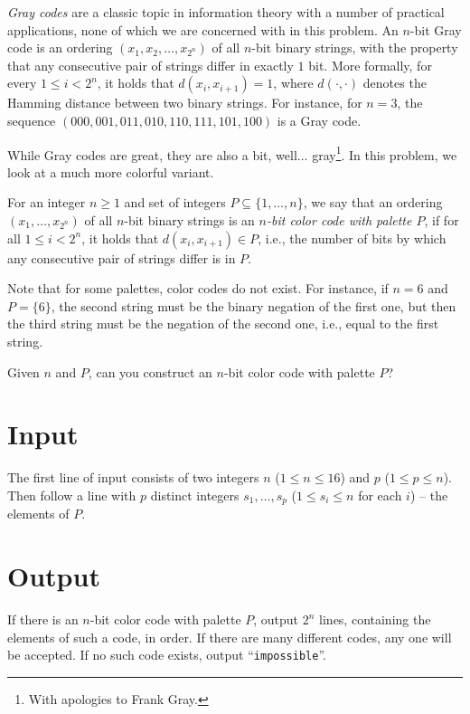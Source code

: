 
%
\noindent
\emph{Gray codes} are a classic topic in information theory with a
number of practical applications, none of which we are concerned with
in this problem.  An $n$-bit Gray code is an ordering $(x_1,
x_2, \ldots, x_{2^n})$ of all $n$-bit binary strings, with the
property that any consecutive pair of strings differ in exactly $1$
bit.  More formally, for every $1 \le i < 2^n$, it holds that
$d(x_{i}, x_{i+1}) = 1$, where $d(\cdot, \cdot)$ denotes the Hamming
distance between two binary strings.  For instance, for $n=3$, the
sequence $(000, 001, 011, 010, 110, 111, 101, 100)$ is a Gray code.

While Gray codes are great, they are also a bit, well... gray\footnote{With
apologies to Frank Gray.}.  In this problem, we look at a much more
colorful variant.

For an integer $n \ge 1$ and set of integers $P \subseteq \{1,
\ldots, n\}$, we say that an ordering $(x_1, \ldots, x_{2^n})$ of all
$n$-bit binary strings is an \emph{$n$-bit color code with palette
  $P$}, if for all $1 \le i < 2^n$, it holds that $d(x_i, x_{i+1}) \in
P$, i.e., the number of bits by which any consecutive pair of strings
differ is in $P$.

Note that for some palettes, color codes do not exist.  For instance,
if $n = 6$ and $P = \{6\}$, the second string must be the binary
negation of the first one, but then the third string must be the
negation of the second one, i.e., equal to the first string.

Given $n$ and $P$, can you construct an $n$-bit color code with
palette $P$?


\section*{Input}
The first line of input consists of two integers $n$ ($1 \le n \le 16$)
and $p$ ($1 \le p \le n$).   Then follow a line with $p$ distinct integers
$s_1, \ldots, s_p$ ($1 \leq s_i \leq n$ for each $i$) -- the elements of $P$.

\section*{Output}

If there is an $n$-bit color code with palette $P$, output $2^n$
lines, containing the elements of such a code, in order.  If there are
many different codes, any one will be accepted.  If no such code
exists, output ``\texttt{impossible}''.
